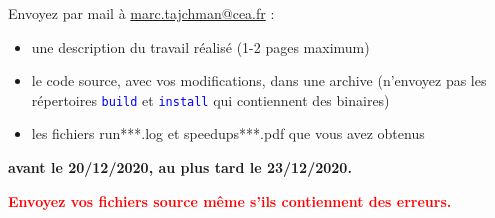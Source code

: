\documentclass{beamer}
\begin{document}
\begin{frame}
\bigskip
Envoyez par mail à \href{mailto:marc.tajchman@cea.fr}{marc.tajchman@cea.fr} :

\begin{itemize}
	\item une description du travail réalisé (1-2 pages maximum)
	\item le code source, avec vos modifications, dans une archive
	(n'envoyez pas les répertoires \textcolor{blue}{\tt build} et  \textcolor{blue}{\tt install} qui contiennent des binaires) 
	\item les fichiers run***.log et speedups***.pdf que vous avez obtenus
\end{itemize}

\bigskip

{\bf avant le 20/12/2020, au plus tard le 23/12/2020.}

\bigskip
\textcolor{red}{\bf Envoyez vos fichiers source même s'ils contiennent des erreurs.}
\end{frame}
\end{document}
